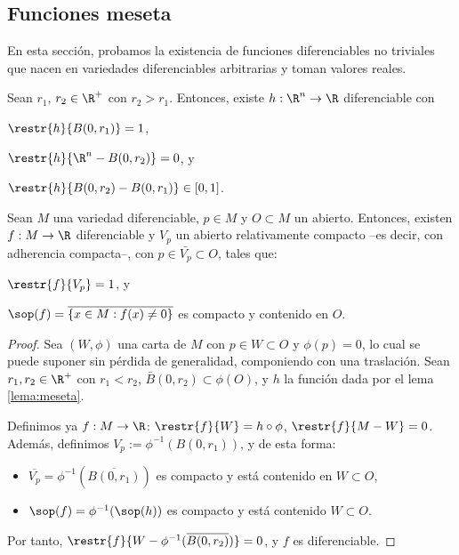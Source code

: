 \subsection{Funciones meseta}

En esta sección, probamos la existencia de funciones diferenciables no triviales
que nacen en variedades diferenciables arbitrarias y toman valores reales.

\begin{lema} \label{lema:meseta}
 Sean $r_{1}$, $r_{2}\in\R^{+}$ con $r_{2}> r_{1}$. Entonces, existe $h:
 \R^{n}\to\R$ diferenciable con
 \begin{nlist}
 \item
   $\restr{h}{B(0,r_{1})} = 1$,
 \item
   $\restr{h}{\R^{n}-B(0,r_{2})} = 0$, y
 \item
   $\restr{h}{B(0,r_{2})-B(0,r_{1})}\in[0,1]$.
 \end{nlist}
\end{lema}

\begin{nprop} \label{prop:meseta}
  Sean $M$ una variedad diferenciable, $p\in M$ y $O\subset M$ un
  abierto. Entonces, existen $f: M\to \R$ diferenciable y $V_{p}$ un abierto
  relativamente compacto --es decir, con adherencia compacta--, con
  $p\in\bar{V_{p}}\subset O$, tales que:
  \begin{nlist}
  \item
    $\restr{f}{V_{p}} = 1$, y
  \item
    $\sop(f) = \overline{\left\{ x\in M : f(x)\ne 0 \right\}}$ es
      compacto y contenido en $O$.
  \end{nlist}
\end{nprop}
\begin{proof}
  Sea $(W,\phi)$ una carta de $M$ con $p\in W\subset O$ y $\phi(p) = 0$, lo cual
  se puede suponer sin pérdida de generalidad, componiendo con una
  traslación. Sean $r_{1},r_{2}\in\R^{+}$ con $r_{1}<r_{2}$,
  $\bar{B}(0,r_{2})\subset\phi(O)$, y $h$ la función dada por el lema
  \ref{lema:meseta}.

  Definimos ya $f: M \to \R$: $\restr{f}{W} = h\circ \phi$, $\restr{f}{M-W} =
  0$. Además, definimos $V_{p} := \phi^{-1}(B(0,r_{1}))$, y de esta forma:
  \begin{itemize}
  \item $\overline{V_{p}} = \phi^{-1}(\overline{B(0,r_{1})})$ es compacto y está
    contenido en $W\subset O$,
  \item $\sop(f) = \phi^{-1}(\sop(h))$ es compacto y
    está contenido $W\subset O$.
  \end{itemize}

  Por tanto, $\restr{f}{W-\phi^{-1}(\overline{B(0,r_{2})})} = 0$, y $f$ es
  diferenciable.
\end{proof}

